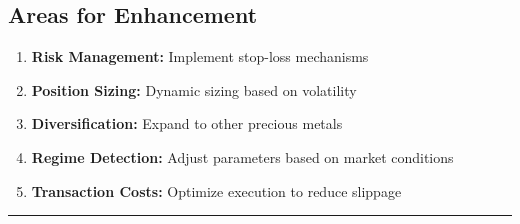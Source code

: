 \documentclass[11pt,a4paper]{article}
\begin{document}
\subsection{Areas for Enhancement}

\begin{enumerate}
    \item \textbf{Risk Management:} Implement stop-loss mechanisms
    \item \textbf{Position Sizing:} Dynamic sizing based on volatility
    \item \textbf{Diversification:} Expand to other precious metals
    \item \textbf{Regime Detection:} Adjust parameters based on market conditions
    \item \textbf{Transaction Costs:} Optimize execution to reduce slippage
\end{enumerate}

\vspace{1cm}

\hrule

\vspace{0.5cm}
\end{document}

